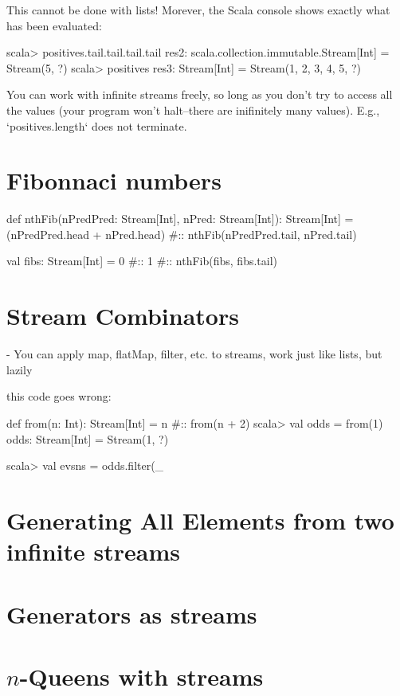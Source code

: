 This cannot be done with lists! Morever, the Scala console shows exactly what has
been evaluated:

\begin{console}
scala> positives.tail.tail.tail.tail
res2: scala.collection.immutable.Stream[Int] = Stream(5, ?)
scala> positives
res3: Stream[Int] = Stream(1, 2, 3, 4, 5, ?)
\end{console}

You can work with infinite streams freely, so long as you don't try to access
all the values (your program won't halt--there are inifinitely many values).
E.g., `positives.length` does not terminate.

\section{Fibonnaci numbers}

\begin{scalacode}
def nthFib(nPredPred: Stream[Int], nPred: Stream[Int]): Stream[Int] = {
  (nPredPred.head + nPred.head) #:: nthFib(nPredPred.tail, nPred.tail)
}

val fibs: Stream[Int] = 0 #:: 1 #:: nthFib(fibs, fibs.tail)
\end{scalacode}

\section{Stream Combinators}

- You can apply map, flatMap, filter, etc. to streams, work just like lists, but
  lazily

this code goes wrong:

\begin{scalacode}
def from(n: Int): Stream[Int] = n #:: from(n + 2)
scala> val odds = from(1)
odds: Stream[Int] = Stream(1, ?)

scala> val evsns = odds.filter(_ %
\end{scalacode}

\section{Generating All Elements from two infinite streams}

\section{Generators as streams}

\section{$n$-Queens with streams} 




